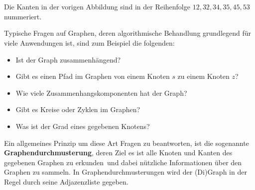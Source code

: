 \begin{bsp} \ 
\begin{center}
\hfill
{}
\hfill
{}
\hfill\,
\end{center}

Die Kanten in der vorigen Abbildung sind in der Reihenfolge $12,32,34,35,45,53$ nummeriert.
\end{bsp}


\begin{bem}
	Typische Fragen auf Graphen, deren algorithmische Behandlung grundlegend für viele Anwendungen ist, sind zum Beispiel die folgenden:
	\begin{itemize}
		\item Ist der Graph zusammenhängend?
		\item Gibt es einen Pfad im Graphen von einem Knoten $s$ zu einem Knoten $z$?
		\item Wie viele Zusammenhangskomponenten hat der Graph?
		\item Gibt es Kreise oder Zyklen im Graphen?
		\item Was ist der Grad eines gegebenen Knotens?
	\end{itemize}
%	
	Ein allgemeines Prinzip um diese Art Fragen zu beantworten, ist die sogenannte \textbf{Graphendurchmusterung}, deren Ziel es ist alle Knoten und Kanten des gegebenen Graphen zu \glqq erkunden\grqq\ und dabei nützliche Informationen über den Graphen zu sammeln. In Graphendurchmusterungen wird der (Di)Graph in der Regel durch seine Adjazenzliste gegeben. 
\end{bem} 

